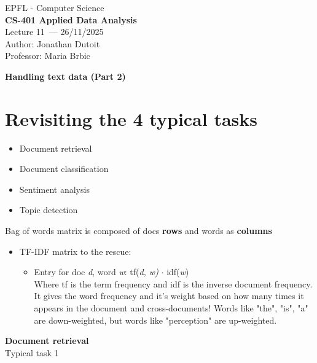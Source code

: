 \documentclass[11pt]{article}
\newcommand{\coursename}{CS-401 Applied Data Analysis}
\newcommand{\lecturenum}{11}
\newcommand{\lecturedate}{26/11/2025}
\newcommand{\professor}{Maria Brbic}
\begin{document}
\begin{center}
  {\large EPFL - Computer Science} \\[0.5em]
  {\Large \textbf{\coursename}} \\[0.5em]
  {\large Lecture \lecturenum\ --- \lecturedate} \\[0.5em]
  {\large Author: Jonathan Dutoit} \\[0.5em]
  {\large Professor: \professor} \\[0.5em]
\end{center}

\vspace{2cm}
\begin{center}
  {\LARGE \textbf{Handling text data (Part 2)}}
\end{center}

\vspace{1cm}
\section*{Revisiting the 4 typical tasks}
\begin{itemize}
	\item Document retrieval
	\item Document classification
	\item Sentiment analysis
	\item Topic detection
\end{itemize}

Bag of words matrix is composed of docs \textbf{rows} and words as \textbf{columns}
\begin{itemize}
	\item TF-IDF matrix to the rescue:
		\begin{itemize}
			\item Entry for doc \textit{d}, word \textit{w}: tf(\textit{d, w)} $\cdot$ idf(\textit{w}) \\
			Where tf is the term frequency and idf is the inverse document frequency. It gives the word frequency and it's weight based on how many times it appears in the document and cross-documents! Words like "the", "is", "a" are down-weighted, but words like "perception" are up-weighted. 
		\end{itemize}
\end{itemize}

\vspace{0.5cm}

\begin{center}
  {\LARGE \textbf{Document retrieval}} \\
  Typical task 1
\end{center}
\vspace{0.5cm}
\end{document}
